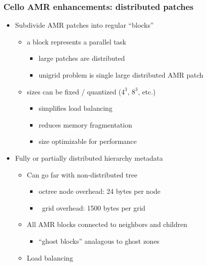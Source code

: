 \begin{frame}[fragile] 
\frametitle{Cello AMR enhancements: distributed patches}
\begin{itemize}
\item Subdivide AMR patches into regular ``blocks''
\begin{itemize}
\item   a block represents a parallel task
\begin{itemize}
\item     large patches are distributed
\item     unigrid problem is single large distributed AMR patch
\end{itemize}
\item   sizes can be fixed / quantized ($4^3$, $8^3$, etc.)
\begin{itemize}
\item     simplifies load balancing
\item     reduces memory fragmentation
\item     size optimizable for performance
\end{itemize}
\end{itemize}
\item Fully or partially distributed hierarchy metadata
\begin{itemize}
\item   Can go far with non-distributed tree
\begin{itemize}
\item     octree node overhead: 24 bytes per node
\item     \enzo\ grid overhead: 1500 bytes per grid
\end{itemize}
\item   All AMR blocks connected to neighbors and children
\begin{itemize}
\item     ``ghost blocks'' analagous to ghost zones
\end{itemize}
\item Load balancing 
\end{itemize}
\end{itemize}
\end{frame}

